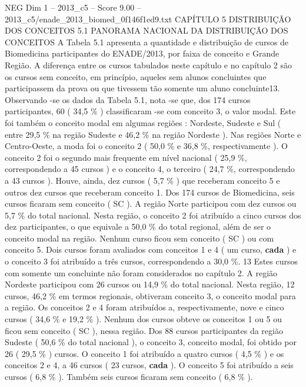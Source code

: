 \begin{textsample}{NEG Dim 1 – 2013\_c5 – Score 9.00 – 2013\_c5/enade\_2013\_biomed\_0f146f1ed9.txt}  \label{ex:f1_neg_358}
CAPÍTULO 5 DISTRIBUIÇÃO DOS CONCEITOS 5.1 PANORAMA NACIONAL DA DISTRIBUIÇÃO DOS CONCEITOS A Tabela 5.1 apresenta a quantidade e distribuição de cursos de Biomedicina participantes do ENADE/2013, por faixa de conceito e Grande Região.
A diferença entre os cursos tabulados neste capítulo e no capítulo 2 são os cursos sem conceito, em princípio, aqueles sem alunos concluintes que participassem da prova ou que tivessem tão somente um aluno concluinte13.
Observando -se os dados da Tabela 5.1, nota -se que, dos 174 cursos participantes, 60 ( 34,5 \% ) classificaram -se com conceito 3, o valor modal.
Este foi também o conceito modal em algumas regiões : Nordeste, Sudeste e Sul ( entre 29,5 \% na região Sudeste e 46,2 \% na região Nordeste ).
Nas regiões Norte e Centro-Oeste, a moda foi o conceito 2 ( 50,0 \% e 36,8 \%, respectivamente ).
O conceito 2 foi o segundo mais frequente em nível nacional ( 25,9 \%, correspondendo a 45 cursos ) e o conceito 4, o terceiro ( 24,7 \%, correspondendo a 43 cursos ).
Houve, ainda, dez cursos ( 5,7 \% ) que receberam conceito 5 e outros dez cursos que receberam conceito 1.
Dos 174 cursos de Biomedicina, seis cursos ficaram sem conceito ( SC ).
A região Norte participou com dez cursos ou 5,7 \% do total nacional.
Nesta região, o conceito 2 foi atribuído a cinco cursos dos dez participantes, o que equivale a 50,0 \% do total regional, além de ser o conceito modal na região.
Nenhum curso ficou sem conceito ( SC ) ou com conceito 5.
Dois cursos foram avaliados com conceitos 1 e 4 ( um curso, \textbf{cada} ) e o conceito 3 foi atribuído a três cursos, correspondendo a 30,0 \%. 13 Estes cursos com somente um concluinte não foram considerados no capítulo 2.
A região Nordeste participou com 26 cursos ou 14,9 \% do total nacional.
Nesta região, 12 cursos, 46,2 \% em termos regionais, obtiveram conceito 3, o conceito modal para a região.
Os conceitos 2 e 4 foram atribuídos a, respectivamente, nove e cinco cursos ( 34,6 \% e 19,2 \% ).
Nenhum dos cursos obteve os conceitos 1 ou 5 ou ficou sem conceito ( SC ), nessa região.
Dos 88 cursos participantes da região Sudeste ( 50,6 \% do total nacional ), o conceito 3, conceito modal, foi obtido por 26 ( 29,5 \% ) cursos.
O conceito 1 foi atribuído a quatro cursos ( 4,5 \% ) e os conceitos 2 e 4, a 46 cursos ( 23 cursos, \textbf{cada} ).
O conceito 5 foi atribuído a seis cursos ( 6,8 \% ).
Também seis cursos ficaram sem conceito ( 6,8 \% ).

\end{textsample}
